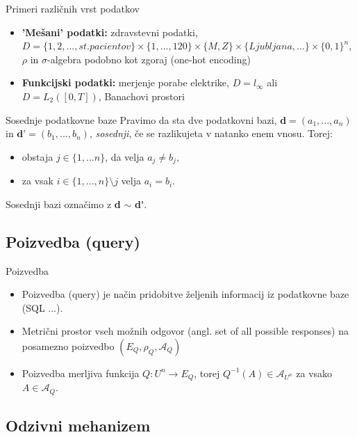 \documentclass{beamer}
\begin{document}
\begin{frame}{Primeri različnih vrst podatkov}
\begin{itemize}
\item \textbf{'Mešani' podatki:} zdravstevni podatki, $D=\{1,2,...,st. pacientov\} \times \{1,...,120\} \times \{M,Z\} \times 
\{Ljubljana, ...\} \times \{0,1\}^n$, $\rho$ in $\sigma$-algebra podobno kot zgoraj (one-hot encoding)
\item \textbf{Funkcijski podatki:} merjenje porabe elektrike,  $D = l_{\infty}$ ali $D = L_2([0,T])$, Banachovi prostori
\end{itemize}
\end{frame}

\begin{frame}{Sosednje podatkovne baze}
Pravimo da sta dve podatkovni bazi, \textbf{d}$= (a_{1},...,a_{n})$ in $\textbf{d'}= (b_{1},...,b_{n})$,  \textit{sosednji}, če se razlikujeta v natanko enem vnosu. Torej:
\begin{itemize}
\item obstaja $j\in\{1,...n\}$, da velja $a_{j} \neq b_{j}$,
\item za vsak $i\in\{1,...,n\} \setminus j$ velja $a_{i} = b_{i}$.
\end{itemize}
Sosednji bazi označimo z \textbf{d} $\sim$ \textbf{d\'}.
\end{frame}

\subsection{Poizvedba (query)}

\begin{frame}{Poizvedba}
\begin{itemize}
\item Poizvedba (query) je način pridobitve željenih informacij iz podatkovne baze (SQL ...).
\item Metrični prostor vseh možnih odgovor (angl. set of all possible responses) na posamezno poizvedbo  $(E_{Q}, \rho_{Q}, \mathcal{A}_{Q})$
\item  Poizvedba merljiva funkcija $Q: U^n \rightarrow E_{Q} $, torej $Q^{-1}(A) \in \mathcal{A}_{U^n}$ za vsako $A \in \mathcal{A}_Q$.
\end{itemize}
\end{frame}

\subsection{Odzivni mehanizem}
\end{document}

